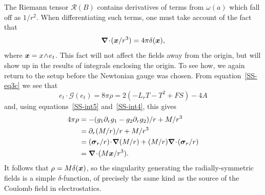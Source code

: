 \documentclass[a4paper]{article}
\numberwithin{equation}{section}
\newcommand{\nn}{\nonumber}
\newcommand{\dt}{\! \cdot \!}
\newcommand{\wdg}{\! \wedge \!}
\newcommand{\del}{\delta}
\newcommand{\sig}{\mbox{\boldmath $\sigma$}}
\newcommand{\om}{\omega}
\newcommand{\bx}{\mbox{\boldmath $x$}}
\newcommand{\bsig}{\mbox{\boldmath $\sig$}}
\newcommand{\clg}{{\mathcal{G}}}
\newcommand{\clr}{{\mathcal{R}}}
\newcommand{\dr}{\partial_r}
\newcommand{\sigr}{\bsig_r}
\newcommand{\grad}{\nabla}
\newcommand{\bgrad}{\mbox{\boldmath $\grad$}}
\begin{document}
The Riemann tensor $\clr(B)$ contains derivatives of terms from
$\om(a)$ which fall off as $1/r^2$.  When differentiating such terms,
one must take account of the fact that 
%
\begin{equation}
\bgrad \dt (\bx/r^3) = 4\pi\del(\bx),
\end{equation}
%
where $\bx=x\wdg e_t$.  This fact will not affect the fields away from
the origin, but will show up in the results of integrals enclosing the
origin.  To see how, we again return to the setup before the Newtonian
gauge was chosen.  From equation~\eqref{SS-eq3c} we see that
%
\begin{equation}
e_t \dt \clg (e_t) =  8 \pi \rho = 2(- L_r T -T^2 + FS) -4A
\end{equation}
%
and, using equations~\eqref{SS-int5} and~\eqref{SS-int4}, this gives
%
\begin{align}
4 \pi \rho &= - (g_1 \dr g_1 - g_2 \dr g_2)/r + M/r^3 \nn \\
&= \dr(M/r) /r + M/r^3 \nn \\
&= (\sigr /r) \dt \bgrad (M/r) + (M/r) \bgrad \dt (\sigr /r) \nn \\
&= \bgrad \dt (M \bx /r^3).
\end{align}
%
It follows that $\rho=M \del(\bx)$, so the singularity generating the
radially-symmetric fields is a simple $\del$-function, of precisely
the same kind as the source of the Coulomb field in electrostatics.
\end{document}
